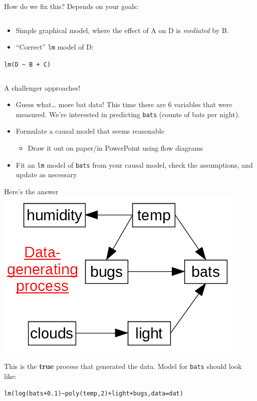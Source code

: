 \documentclass[
  ignorenonframetext,
  aspectratio=169]{beamer}
\providecommand{\tightlist}{%
  \setlength{\itemsep}{0pt}\setlength{\parskip}{0pt}}
\begin{document}
\begin{frame}[fragile]{How do we fix this? Depends on your goals:}
\begin{columns}[T]
\begin{column}{0.48\textwidth}
\begin{itemize}[<+->]
\tightlist
\item
  Simple graphical model, where the effect of A on D is \emph{mediated}
  by B.
\item
  ``Correct'' \texttt{lm} model of D:
\end{itemize}

\texttt{lm(D\ \textasciitilde{}\ B\ +\ C)}
\end{column}
\end{columns}
\end{frame}

\begin{frame}[fragile]{A challenger approaches!}
\protect\hypertarget{a-challenger-approaches-2}{}
\begin{itemize}[<+->]
\tightlist
\item
  Guess what\ldots{} more bat data! This time there are 6 variables that
  were measured. We're interested in predicting \texttt{bats} (counts of
  bats per night).
\item
  Formulate a causal model that seems reasonable

  \begin{itemize}[<+->]
  \tightlist
  \item
    Draw it out on paper/in PowerPoint using flow diagrams
  \end{itemize}
\item
  Fit an \texttt{lm} model of \texttt{bats} from your causal model,
  check the assumptions, and update as necessary
\end{itemize}
\end{frame}

\begin{frame}[fragile]{Here's the answer}
\protect\hypertarget{heres-the-answer}{}
\includegraphics[width=0.7\linewidth]{./dag2}

This is the \textbf{true} process that generated the data. Model for
\texttt{bats} should look like:

\texttt{lm(log(bats+0.1)\textasciitilde{}poly(temp,2)+light+bugs,data=dat)}
\end{frame}
\end{document}
